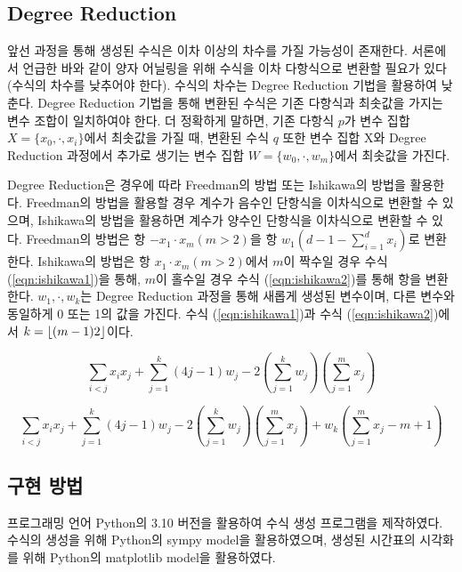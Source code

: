 \documentclass[12pt,a4paper]{article}
\begin{document}
    \subsection{Degree Reduction}

    앞선 과정을 통해 생성된 수식은 이차 이상의 차수를 가질 가능성이 존재한다. 서론에서 언급한 바와 같이 양자 어닐링을 위해 수식을 이차 다항식으로 변환할 필요가 있다(수식의 차수를 낮추어야 한다). 수식의 차수는 Degree Reduction 기법을 활용하여 낮춘다. Degree Reduction 기법을 통해 변환된 수식은 기존 다항식과 최솟값을 가지는 변수 조합이 일치하여야 한다. 더 정확하게 말하면, 기존 다항식 $p$가 변수 집합 $X=\{x_{0},\cdot,x_{i} \}$에서 최솟값을 가질 때, 변환된 수식 $q$ 또한 변수 집합 X와 Degree Reduction 과정에서 추가로 생기는 변수 집합 $W=\{w_{0},\cdot,w_{m} \}$에서 최솟값을 가진다.

    Degree Reduction은 경우에 따라 Freedman의 방법 또는 Ishikawa의 방법을 활용한다. Freedman의 방법을 활용할 경우 계수가 음수인 단항식을 이차식으로 변환할 수 있으며\cite{freedman2005energy}, Ishikawa의 방법을 활용하면 계수가 양수인 단항식을 이차식으로 변환할 수 있다. \cite{ishikawa2010transformation} Freedman의 방법은 항 $-x_{1}\cdot x_{m} (m>2)$을 항 $w_{1} (d-1-\sum_{i=1}^{d}x_{i} )$로 변환한다. Ishikawa의 방법은 항 $x_{1}\cdot x_{m} (m>2)$에서 $m$이 짝수일 경우 수식 (\ref{eqn:ishikawa1})을 통해, $m$이 홀수일 경우 수식 (\ref{eqn:ishikawa2})를 통해 항을 변환한다. $w_{1},\cdot,w_{k}$는 Degree Reduction 과정을 통해 새롭게 생성된 변수이며, 다른 변수와 동일하게 0 또는 1의 값을 가진다. 수식 (\ref{eqn:ishikawa1})과 수식 (\ref{eqn:ishikawa2})에서 $k = \lfloor (m-1)\/2 \rfloor$이다. 

    \begin{equation}\label{eqn:ishikawa1}
        \sum_{i<j}x_{i}  x_{j}+\sum_{j=1}^{k}(4j-1) w_{j} -2\left( \sum_{j=1}^{k}w_{j} \right) \left ( \sum_{j=1}^{m}x_{j} \right )
    \end{equation}

    \begin{equation}\label{eqn:ishikawa2}
            \sum_{i<j}x_{i}  x_{j}+\sum_{j=1}^{k} (4j-1) w_{j} - 2\left ( \sum_{j=1}^{k}w_{j} \right) \left(\sum_{j=1}^{m}x_{j} \right)+w_{k} \left (\sum_{j=1}^{m}x_{j} -m+1\right )
    \end{equation}

    \subsection{구현 방법}

    프로그래밍 언어 Python의 3.10 버전을 활용하여 수식 생성 프로그램을 제작하였다. 수식의 생성을 위해 Python의 sympy model을 활용하였으며, 생성된 시간표의 시각화를 위해 Python의 matplotlib model을 활용하였다. 
\end{document}
